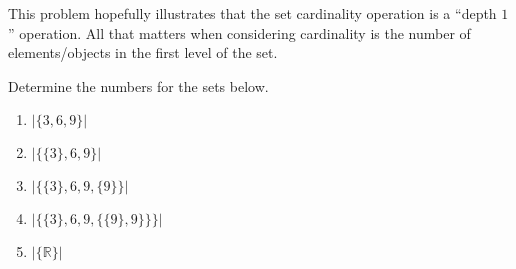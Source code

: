 This problem hopefully illustrates that the set cardinality operation is a ``depth $1$'' operation. All that matters when considering cardinality is the number of elements/objects in the first level of the set.

Determine the numbers for the sets below.
\begin{enumerate}
    \item $\vert \{3, 6, 9 \} \vert$
	\item $\vert \{ \{ 3\}, 6, 9 \} \vert$
	\item $\vert \{ \{3\}, 6, 9, \{ 9\} \} \vert$
	\item $\vert \{ \{ 3\}, 6, 9, \{ \{ 9 \}, 9\} \} \} \vert$
	\item $|\{\mathbb{R}\}|$
\end{enumerate}

